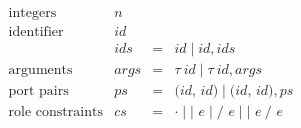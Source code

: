 \documentclass{report}
\begin{document}
\begin{figure}
\[ \begin{array}{lrcl}

\textrm{integers} & n & & \\
\textrm{identifier} & id & & \\
                    & ids & = & id \mid id, ids \\ [6pt]

\textrm{arguments}
                  & args & = & \tau~id \mid \tau~id, args \\
\textrm{port pairs} & ps & = & \texttt{($id$, $id$)} \mid \texttt{($id$, $id$)}, ps \\
\textrm{role constraints} & cs & = & \cdot \mid \texttt{|~$e$} %
                                     \mid \texttt{/~$e$}       %
                                     \mid \texttt{|~$e$}~\texttt{/~$e$} \\ [6pt]


\end{array}\]
\end{figure}
\end{document}
